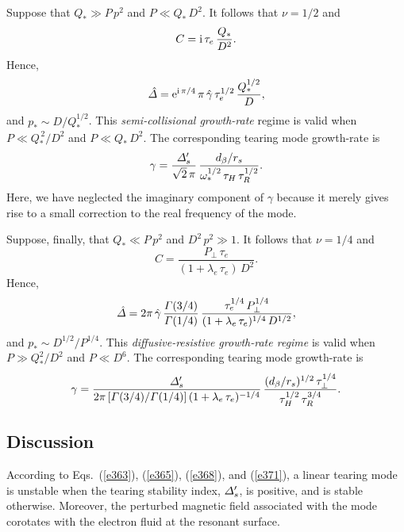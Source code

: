 \documentclass[12pt,prb,aps]{revtex4-1}
\begin{document}
Suppose that $Q_\ast\gg P\,p^2$ and $P\ll Q_\ast\,D^2$. It follows that $\nu=1/2$ and
\begin{equation}
C = {\rm i}\,\tau_e\,\frac{Q_\ast}{D^2}.
\end{equation} 
Hence, 
\begin{equation}
\hat{\mit\Delta} = {\rm e}^{{\rm i}\,\pi/4}\,\pi\,\hat{\gamma}\,\tau_e^{1/2}\,\frac{Q_\ast^{1/2}}{D},
\end{equation}
and $p_\ast\sim D/Q_\ast^{1/2}$. This  {\em semi-collisional growth-rate}\/ regime is valid when $P\ll Q_\ast^{\,2}/D^2$ and
$P\ll Q_\ast\,D^2$. 
The corresponding tearing mode growth-rate is
\begin{equation}\label{e368}
\gamma = \frac{{\mit\Delta}_s'}{\sqrt{2}\,\pi}\,\frac{d_\beta/r_s}{\omega_\ast^{1/2}\,\tau_H\,\tau_R^{1/2}}.
\end{equation}
Here, we have neglected the imaginary component of $\gamma$ because it merely gives rise to a small correction to the
real frequency of the mode. 

Suppose, finally, that $Q_\ast \ll P\,p^2$ and $D^2\,p^2\gg 1$. It follows that $\nu=1/4$ and
\begin{equation}
C = \frac{P_\perp\,\tau_e}{(1+\lambda_e\,\tau_e)\,D^2}.
\end{equation} 
Hence,
\begin{equation} 
\hat{\mit\Delta} = 2\pi\,\hat{\gamma}\,\frac{{\mit\Gamma}(3/4)}{{\mit\Gamma}(1/4)}\,\frac{\tau_e^{1/4}\,P_\perp^{1/4}}{(1+\lambda_e\,\tau_e)^{1/4}\,D^{1/2}},
\end{equation}
and $p_\ast \sim D^{1/2}/P^{1/4}$. This {\em diffusive-resistive growth-rate regime}\/ is valid when $P\gg Q_\ast^2/D^2$ and
$P\ll D^6$. The corresponding tearing mode growth-rate is 
\begin{equation}\label{e371}
\gamma= \frac{{\mit\Delta}_s'}{2\pi\,[{\mit\Gamma}(3/4)/{\mit\Gamma}(1/4)]\,(1+\lambda_e\,\tau_e)^{-1/4}}\,\frac{(d_\beta/r_s)^{1/2}\,\tau_\perp^{1/4}}{\tau_H^{1/2}\,\tau_R^{3/4}}.
\end{equation}

\subsection{Discussion}
According to Eqs.~(\ref{e363}), (\ref{e365}), (\ref{e368}), and (\ref{e371}), a linear tearing mode is unstable when the tearing stability index, ${\mit\Delta}_s'$, is positive, and is stable otherwise.\cite{fkr}
Moreover, the perturbed magnetic field associated with the mode corotates with the electron fluid at the resonant surface.\cite{ara} 
\end{document}
